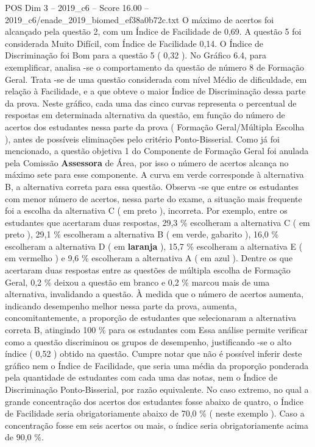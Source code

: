 \begin{textsample}{POS Dim 3 – 2019\_c6 – Score 16.00 – 2019\_c6/enade\_2019\_biomed\_ef38a0b72c.txt}
O máximo de acertos foi alcançado pela questão 2, com um Índice de Facilidade de 0,69.
A questão 5 foi considerada Muito Difícil, com Índice de Facilidade 0,14.
O Índice de Discriminação foi Bom para a questão 5 ( 0,32 ).
No Gráfico 6.4, para exemplificar, analisa -se o comportamento da questão de número 8 de Formação Geral.
Trata -se de uma questão considerada com nível Médio de dificuldade, em relação à Facilidade, e a que obteve o maior Índice de Discriminação dessa parte da prova.
Neste gráfico, cada uma das cinco curvas representa o percentual de respostas em determinada alternativa da questão, em função do número de acertos dos estudantes nessa parte da prova ( Formação Geral/Múltipla Escolha ), antes de possíveis eliminações pelo critério Ponto-Bisserial.
Como já foi mencionado, a questão objetiva 1 do Componente de Formação Geral foi anulada pela Comissão \textbf{Assessora} de Área, por isso o número de acertos alcança no máximo sete para esse componente.
A curva em verde corresponde à alternativa B, a alternativa correta para essa questão.
Observa -se que entre os estudantes com menor número de acertos, nessa parte do exame, a situação mais frequente foi a escolha da alternativa C ( em preto ), incorreta.
Por exemplo, entre os estudantes que acertaram duas respostas, 29,3 \% escolheram a alternativa C ( em preto ), 29,1 \% escolheram a alternativa B ( em verde, gabarito ), 16,0 \% escolheram a alternativa D ( em \textbf{laranja} ), 15,7 \% escolheram a alternativa E ( em vermelho ) e 9,6 \% escolheram a alternativa A ( em azul ).
Dentre os que acertaram duas respostas entre as questões de múltipla escolha de Formação Geral, 0,2 \% deixou a questão em branco e 0,2 \% marcou mais de uma alternativa, invalidando a questão.
À medida que o número de acertos aumenta, indicando desempenho melhor nessa parte da prova, aumenta, concomitantemente, a proporção de estudantes que selecionaram a alternativa correta B, atingindo 100 \% para os estudantes com Essa análise permite verificar como a questão discriminou os grupos de desempenho, justificando -se o alto índice ( 0,52 ) obtido na questão.
Cumpre notar que não é possível inferir deste gráfico nem o Índice de Facilidade, que seria uma média da proporção ponderada pela quantidade de estudantes com cada uma das notas, nem o Índice de Discriminação Ponto-Bisserial, por razão equivalente.
No caso extremo, no qual a grande concentração dos acertos dos estudantes fosse abaixo de quatro, o Índice de Facilidade seria obrigatoriamente abaixo de 70,0 \% ( neste exemplo ).
Caso a concentração fosse em seis acertos ou mais, o índice seria obrigatoriamente acima de 90,0 \%.

\end{textsample}
